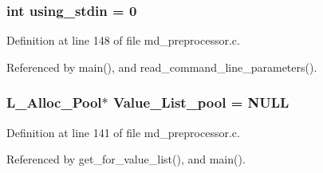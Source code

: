 \subsubsection{\setlength{\rightskip}{0pt plus 5cm}int \bf{using\_\-stdin} = 0}\label{md__preprocessor_8c_bc340a0cfa46e3f25a4d1adab28331c0}




Definition at line 148 of file md\_\-preprocessor.c.

Referenced by main(), and read\_\-command\_\-line\_\-parameters().
\subsubsection{\setlength{\rightskip}{0pt plus 5cm}\bf{L\_\-Alloc\_\-Pool}$\ast$ \bf{Value\_\-List\_\-pool} = \bf{NULL}}\label{md__preprocessor_8c_cb94a38a26e21dc0042efb3fe66cc3ac}




Definition at line 141 of file md\_\-preprocessor.c.

Referenced by get\_\-for\_\-value\_\-list(), and main().